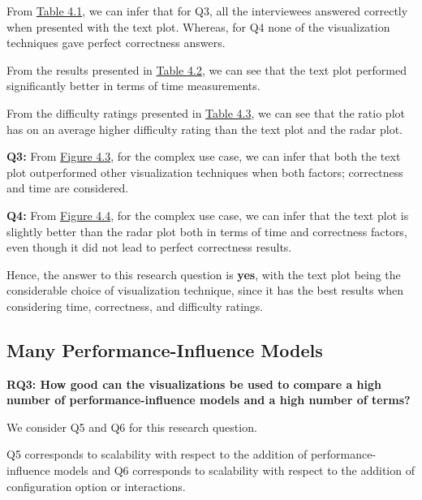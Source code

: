 \begin{description}[leftmargin=0pt]
\item[Correctness: ] From \hyperref[table:correctness]{Table 4.1}, we can infer that for Q3, all the interviewees answered correctly when presented with the text plot. Whereas, for Q4 none of the visualization techniques gave perfect correctness answers.

\item[Time Measurements: ] From the results presented in \hyperref[table:time]{Table 4.2}, we can see that the text plot performed significantly better in terms of time measurements.

\item[Difficulty Ratings: ] From the difficulty ratings presented in \hyperref[table:rating]{Table 4.3}, we can see that the ratio plot has on an average higher difficulty rating than the text plot and the radar plot.

\end{description}

\textbf{Q3:} From \hyperref[figure:paretoTwoQ3]{Figure 4.3}, for the complex use case, we can infer that both the text plot outperformed other visualization techniques when both factors; correctness and time are considered.

\textbf{Q4:} From \hyperref[figure:paretoTwoQ4]{Figure 4.4}, for the complex use case, we can infer that the text plot is slightly better than the radar plot both in terms of time and correctness factors, even though it did not lead to perfect correctness results.

Hence, the answer to this research question is \textbf{yes}, with the text plot being the considerable choice of visualization technique, since it has the best results when considering time, correctness, and difficulty ratings.

\subsection*{Many Performance-Influence Models}

\vskip 0.2in
\begin{mdframed}
\textbf{RQ3: How good can the visualizations be used to compare a high number of performance-influence models and a high number of terms?}
\end{mdframed}

We consider Q5 and Q6 for this research question.

Q5 corresponds to scalability with respect to the addition of performance-influence models and Q6 corresponds to scalability with respect to the addition of configuration option or interactions.

